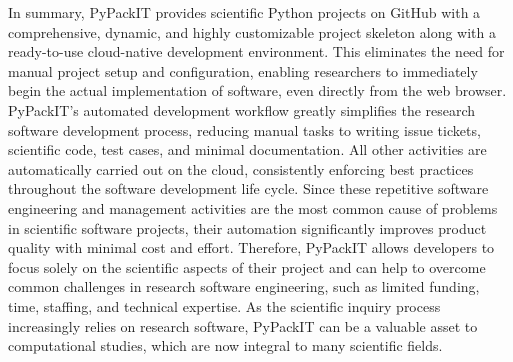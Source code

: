 \documentclass{article}
\begin{document}
In summary, PyPackIT provides scientific Python projects on GitHub with a comprehensive, dynamic, and highly customizable project skeleton along with a ready-to-use cloud-native development environment. This eliminates the need for manual project setup and configuration, enabling researchers to immediately begin the actual implementation of software, even directly from the web browser. PyPackIT's automated development workflow greatly simplifies the research software development process, reducing manual tasks to writing issue tickets, scientific code, test cases, and minimal documentation. All other activities are automatically carried out on the cloud, consistently enforcing best practices throughout the software development life cycle. Since these repetitive software engineering and management activities are the most common cause of problems in scientific software projects, their automation significantly improves product quality with minimal cost and effort. Therefore, PyPackIT allows developers to focus solely on the scientific aspects of their project and can help to overcome common challenges in research software engineering, such as limited funding, time, staffing, and technical expertise. As the scientific inquiry process increasingly relies on research software, PyPackIT can be a valuable asset to computational studies, which are now integral to many scientific fields. 

\printbibliography
\end{document}
